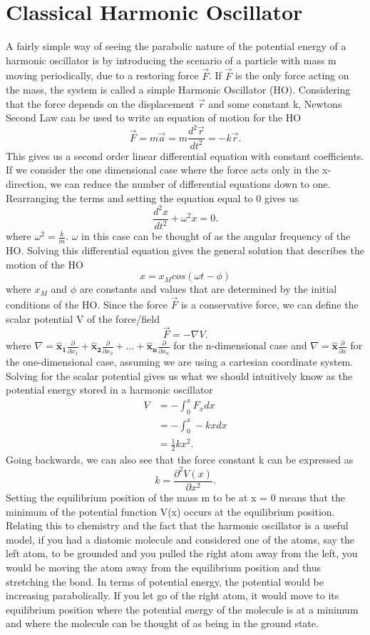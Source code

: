 \documentclass{article}
\newcommand{\be}{\begin{equation}}
\newcommand{\ee}{\end{equation}}
\begin{document}
\section{Classical Harmonic Oscillator}
A fairly simple way of seeing the parabolic nature of the potential energy of a harmonic oscillator is by introducing the scenario of a particle with mass m moving periodically, due to a restoring force
$\vec{F}$. If $\vec{F}$ is the only force acting on the mass, the system is called a simple Harmonic Oscillator (HO). Considering that the force depends on the displacement $\vec{r}$ and some constant k,
Newtons Second Law can be used to write an equation of motion for the HO
\be
\vec{F}=m\vec{a}=m\frac{d^2\vec{r}}{dt^2}=-k\vec{r} .
\ee
This gives us a second order linear differential equation with constant coefficients. If we consider the one dimensional case where the force acts only in the x-direction, we can reduce the number of
differential equations down to one. Rearranging the terms and setting the equation equal to 0 gives us
\be
\frac{d^2x}{dt^2} + \omega^2 x = 0.
\ee
where $\omega^2 = \frac{k}{m}$. $\omega$ in this case can be thought of as the angular frequency of the HO. Solving this differential equation gives the general solution that describes the motion of the HO
\be
x=x_Mcos(\omega t - \phi)
\ee
where $x_M$ and $\phi$ are constants and values that are determined by the initial conditions of the HO.
Since the force $\vec{F}$ is a conservative force, we can define the scalar potential V of the force/field
\be
\vec{F} = - \nabla V.
\ee
where $\nabla = \boldsymbol{\hat{x}_1}\frac{\partial}{\partial x_1} + \boldsymbol{\hat{x}_2}\frac{\partial}{\partial x_2} + ... + \boldsymbol{\hat{x}_n}\frac{\partial}{\partial x_n}$ for the n-dimensional
case and $\nabla = \boldsymbol{\hat{x}}\frac{\partial}{\partial x}$ for the one-dimensional case, assuming we are using a cartesian coordinate system.
Solving for the scalar potential gives us what we should intuitively know as the potential energy stored in a harmonic oscillator
\be
\begin{split}
V &= - \int_{0}^{x} F_x dx \\
&= - \int_{0}^{x} - k x dx \\
&= \frac{1}{2}kx^2 .
\end{split}
\ee
Going backwards, we can also see that the force constant k can be expressed as
\be
k=\frac{\partial^2V(x)}{\partial x^2}.
\ee
Setting the equilibrium position of the mass m to be at x = 0 means that the minimum of the potential function V(x) occurs at the equilibrium position. Relating this to chemistry
and the fact that the harmonic oscillator is a useful model, if you had a diatomic molecule and considered one of the atoms, say the left atom, to be grounded and you pulled the
right atom away from the left, you would be moving the atom away from the equilibrium position and thus stretching the bond. In terms of potential energy, the potential would be
increasing parabolically. If you let go of the right atom, it would move to its equilibrium position where the potential energy of the molecule is at a minimum and where the
molecule can be thought of as being in the ground state.
\end{document}
